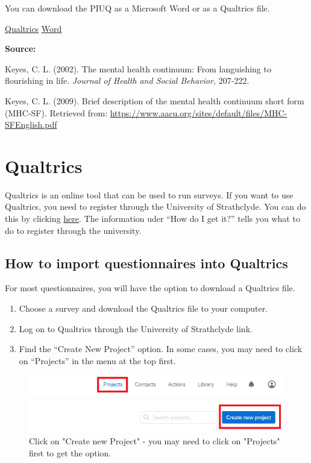 \documentclass[
]{book}
\providecommand{\tightlist}{%
  \setlength{\itemsep}{0pt}\setlength{\parskip}{0pt}}
\begin{document}
You can download the PIUQ as a Microsoft Word or as a Qualtrics file.

\href{link}{Qualtrics} \textbar{}
\href{link}{Word}

\textbf{Source:}

Keyes, C. L. (2002). The mental health continuum: From languishing to flourishing in life. \emph{Journal of Health and Social Behavior,} 207-222.

Keyes, C. L. (2009). Brief description of the mental health continuum short form (MHC-SF). Retrieved from: \url{https://www.aacu.org/sites/default/files/MHC-SFEnglish.pdf}

\hypertarget{qualtrics}{%
\chapter{Qualtrics}\label{qualtrics}}

Qualtrics is an online tool that can be used to run surveys. If you want to use Qualtrics, you need to register through the University of Strathclyde. You can do this by clicking \href{https://www.strath.ac.uk/is/software/qualtrics/}{here}. The information uder ``How do I get it?'' tells you what to do to register through the university.

\hypertarget{how-to-import-questionnaires-into-qualtrics}{%
\section{How to import questionnaires into Qualtrics}\label{how-to-import-questionnaires-into-qualtrics}}

For most questionnaires, you will have the option to download a Qualtrics file.

\begin{enumerate}
\def\labelenumi{\arabic{enumi}.}
\tightlist
\item
  Choose a survey and download the Qualtrics file to your computer.
\item
  Log on to Qualtrics through the University of Strathclyde link.
\item
  Find the ``Create New Project'' option. In some cases, you may need to click on ``Projects'' in the menu at the top first.
\end{enumerate}

\begin{figure}

{\centering \includegraphics[width=0.85\linewidth]{images/Qualtrics/02NewProject} 

}

\caption{Click on "Create new Project" - you may need to click on "Projects" first to get the option.}\label{fig:Figure11-2}
\end{figure}
\end{document}
